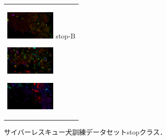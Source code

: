 \begin{enumerate}
\begin{end}
\begin{figure}[htbp]
\begin{tabular}{l}
\begin{minipage}{0.165\hsize}
\begin{center}
          \hspace{0.0cm} { }
        \end{center}
      \end{minipage}
      \begin{minipage}{0.165\hsize}
        \begin{center}
          \includegraphics[clip, width=2.5cm]{./Figures/optic_stop2-3.eps}
          \hspace{2.0cm} {stop-B}
        \end{center}
      \end{minipage}
      \begin{minipage}{0.165\hsize}
        \begin{center}
          \includegraphics[clip, width=2.5cm]{./Figures/optic_stop2-4.eps}
          \hspace{0.1cm} { }
        \end{center}
      \end{minipage}
      \begin{minipage}{0.165\hsize}
        \begin{center}
          \includegraphics[clip, width=2.5cm]{./Figures/optic_stop2-5.eps}
          \hspace{2.2cm} { }
        \end{center}
      \end{minipage}
    \end{tabular}
    \caption{サイバーレスキュー犬訓練データセットstopクラス．}
    \label{stop}
\end{figure}

\begin{figure}[H]
    \begin{tabular}{l}


\\ %


\end{tabular}
\end{figure}
\end{end}
\end{enumerate}
